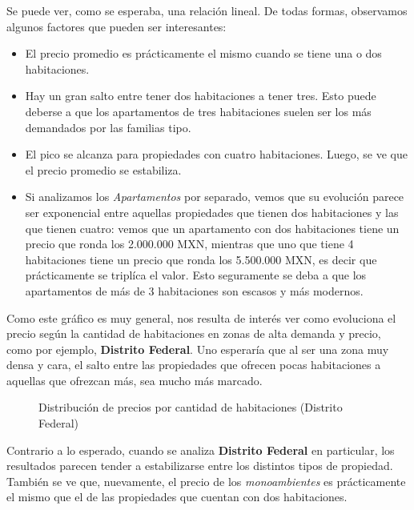 \documentclass[
10pt, %
a4paper, %
oneside, %
headinclude,footinclude, %
BCOR5mm, %
]{scrartcl}
\begin{document}
    Se puede ver, como se esperaba, una relaci\'on lineal. De todas formas, observamos algunos factores que pueden ser interesantes:
    
    \begin{itemize}
        \item El precio promedio es pr\'acticamente el mismo cuando se tiene una o dos habitaciones.
        \item Hay un gran salto entre tener dos habitaciones a tener tres. Esto puede deberse a que los apartamentos de tres habitaciones suelen ser los m\'as demandados por las familias tipo.
        \item El pico se alcanza para propiedades con cuatro habitaciones. Luego, se ve que el precio promedio se estabiliza.
        \item Si analizamos los \textit{Apartamentos} por separado, vemos que su evoluci\'on parece ser exponencial entre aquellas propiedades que tienen dos habitaciones y las que tienen cuatro: vemos que un apartamento con dos habitaciones tiene un precio que ronda los 2.000.000 MXN, mientras que uno que tiene 4 habitaciones tiene un precio que ronda los 5.500.000 MXN, es decir que pr\'acticamente se tripl\'ica el valor. Esto seguramente se deba a que los apartamentos de m\'as de 3 habitaciones son escasos y m\'as modernos.
    \end{itemize}
    
    Como este gr\'afico es muy general, nos resulta de inter\'es ver como evoluciona el precio seg\'un la cantidad de habitaciones en zonas de alta demanda y precio, como por ejemplo, \textbf{Distrito Federal}. Uno esperar\'ia que al ser una zona muy densa y cara, el salto entre las propiedades que ofrecen pocas habitaciones a aquellas que ofrezcan m\'as, sea mucho m\'as marcado.
    
    \begin{figure}[H]
        \caption{Distribuci\'on de precios por cantidad de habitaciones (Distrito Federal)}
        \label{fig:precio-distribucion-habitacionesdf}
    \end{figure}
    
    Contrario a lo esperado, cuando se analiza \textbf{Distrito Federal} en particular, los resultados parecen tender a estabilizarse entre los distintos tipos de propiedad. Tambi\'en se ve que, nuevamente, el precio de los \textit{monoambientes} es pr\'acticamente el mismo que el de las propiedades que cuentan con dos habitaciones.
    
\end{document}
